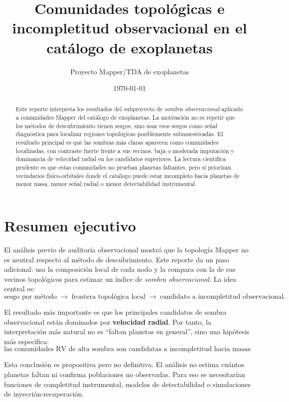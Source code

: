 \documentclass[11pt]{article}
\title{Comunidades topológicas e incompletitud observacional en el catálogo de exoplanetas}
\author{Proyecto Mapper/TDA de exoplanetas}
\date{\today}
\begin{document}
\maketitle

\begin{abstract}
Este reporte interpreta los resultados del subproyecto de \emph{sombra observacional} aplicado a comunidades Mapper del catálogo de exoplanetas. La motivación no es repetir que los métodos de descubrimiento tienen sesgos, sino usar esos sesgos como señal diagnóstica para localizar regiones topológicas posiblemente submuestreadas. El resultado principal es que las sombras más claras aparecen como comunidades localizadas, con contraste fuerte frente a sus vecinos, baja o moderada imputación y dominancia de velocidad radial en los candidatos superiores. La lectura científica prudente es que estas comunidades no prueban planetas faltantes, pero sí priorizan vecindarios físico-orbitales donde el catálogo puede estar incompleto hacia planetas de menor masa, menor señal radial o menor detectabilidad instrumental.
\end{abstract}

\section{Resumen ejecutivo}

El análisis previo de auditoría observacional mostró que la topología Mapper no es neutral respecto al método de descubrimiento. Este reporte da un paso adicional: usa la composición local de cada nodo y la compara con la de sus vecinos topológicos para estimar un índice de \emph{sombra observacional}. La idea central es:
\[
\text{sesgo por método} \;\longrightarrow\; \text{frontera topológica local} \;\longrightarrow\; \text{candidato a incompletitud observacional}.
\]

El resultado más importante es que los principales candidatos de sombra observacional están dominados por \textbf{velocidad radial}. Por tanto, la interpretación más natural no es ``faltan planetas en general'', sino una hipótesis más específica:
\[
\boxed{\text{las comunidades RV de alta sombra son candidatas a incompletitud hacia masas menores o señales radiales débiles.}}
\]

Esta conclusión es propositiva pero no definitiva. El análisis no estima cuántos planetas faltan ni confirma poblaciones no observadas. Para eso se necesitarían funciones de completitud instrumental, modelos de detectabilidad o simulaciones de inyección-recuperación.
\end{document}
